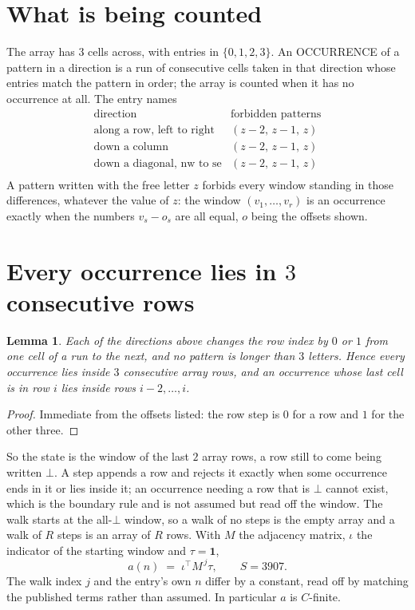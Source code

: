 \documentclass[11pt,a4paper]{article}
\theoremstyle{plain}
\newtheorem{lemma}[theorem]{Lemma}
\theoremstyle{definition}
\begin{document}
\section{What is being counted}

The array has $3$ cells across, with entries in $\{0,1,2,3\}$. An OCCURRENCE of a pattern in a
direction is a run of consecutive cells taken in that direction whose entries match the pattern
in order; the array is counted when it has no occurrence at all. The entry names
\[
\begin{array}{ll}
\text{direction} & \text{forbidden patterns} \\[2pt]
\text{along a row, left to right} & (z-2,\,z-1,\,z) \\
\text{down a column} & (z-2,\,z-1,\,z) \\
\text{down a diagonal, nw to se} & (z-2,\,z-1,\,z) \\
\end{array}
\]
 A pattern written with the free letter $z$ forbids every window standing in those differences, whatever the value of $z$: the window $(v_1,\dots,v_r)$ is an occurrence exactly when the numbers $v_s-o_s$ are all equal, $o$ being the offsets shown.

\section{Every occurrence lies in $3$ consecutive rows}

\begin{lemma}\label{lem:win}
Each of the directions above changes the row index by $0$ or $1$ from one cell of a run to the
next, and no pattern is longer than $3$ letters. Hence every occurrence lies inside $3$
consecutive array rows, and an occurrence whose last cell is in row $i$ lies inside rows
$i-2,\dots,i$.
\end{lemma}

\begin{proof}
Immediate from the offsets listed: the row step is $0$ for a row and $1$ for the other three.
\end{proof}

So the state is the window of the last $2$ array rows, a row still to come being written
$\bot$. A step appends a row and rejects it exactly when some occurrence ends in it or lies
inside it; an occurrence needing a row that is $\bot$ cannot exist, which is the boundary rule
and is not assumed but read off the window. The walk starts at the all-$\bot$ window, so a walk
of no steps is the empty array and a walk of $R$ steps is an array of $R$ rows. With $M$ the
adjacency matrix, $\iota$ the indicator of the starting window and $\tau=\mathbf{1}$,
\[
a(n)\;=\;\iota^{\!\top}M^{\,j}\tau ,\qquad S=3907.
\]
The walk index $j$ and the entry's own $n$ differ by a constant, read off by matching the
published terms rather than assumed. In particular $a$ is $C$-finite.
\end{document}
